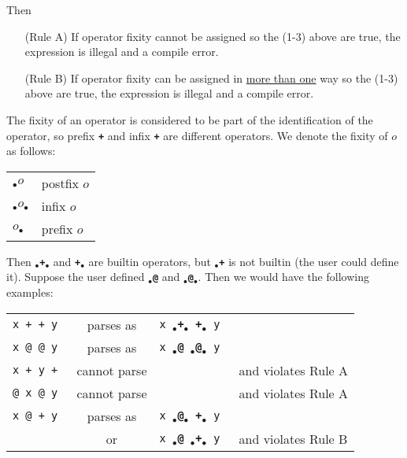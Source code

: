 \documentclass[12pt]{article}
\newcommand{\TT}[1]{{\tt \bfseries #1}}
\newenvironment{indpar}[1][0.3in]%
	{\begin{list}{}%
		     {\setlength{\itemsep}{0in}%
		      \setlength{\topsep}{0in}%
		      \setlength{\parsep}{1ex}%
		      \setlength{\labelwidth}{#1}%
		      \setlength{\leftmargin}{#1}%
		      \addtolength{\leftmargin}{\labelsep}}%
	 \item}%
	{\end{list}}
\begin{document}
Then
\begin{indpar}[0.5in]
\begin{itemize}
\item[(Rule A)] If operator fixity cannot be assigned so the (1-3)
above are true, the expression is illegal and a compile error.
\item[(Rule B)] If operator fixity can be assigned in \underline{more than one}
way so the (1-3) above are true, the expression is illegal and a compile error.
\end{itemize}
\end{indpar}

\newcommand{\IX}[1]{$_{\bullet}$\TT{#1}$_{\bullet}$}
\newcommand{\RX}[1]{\TT{#1}$_{\bullet}$}
\newcommand{\LX}[1]{$_{\bullet}$\TT{#1}}

The fixity of an operator is considered to be part of
the identification of the operator, so prefix \TT{+}
and infix \TT{+} are different operators.
We denote the fixity of \TT{$o$} as follows:
\begin{center}
\begin{tabular}{ll}
\LX{$o$} & postfix \TT{$o$} \\
\IX{$o$} & infix \TT{$o$} \\
\RX{$o$} & prefix \TT{$o$} \\
\end{tabular}
\end{center}

Then \IX{+} and \RX{+} are builtin operators, but \LX{+}
is not builtin (the user could define it).  Suppose the
user defined \LX{@} and \IX{@}.  Then we would have the
following examples:

\begin{center}
\begin{tabular}{lcll}
\tt x + + y	& parses as & \tt x \IX{+} \RX{+} y \\
\tt x @ @ y	& parses as & \tt x \LX{@} \IX{@} y \\
\tt x + y +	& cannot parse & & and violates Rule A \\
\tt @ x @ y	& cannot parse & & and violates Rule A \\
\tt x @ + y	& parses as & \tt x \IX{@} \RX{+} y \\
		& or        & \tt x \LX{@} \IX{+} y
			    & and violates Rule B \\
\end{tabular}
\end{center}
\end{document}
